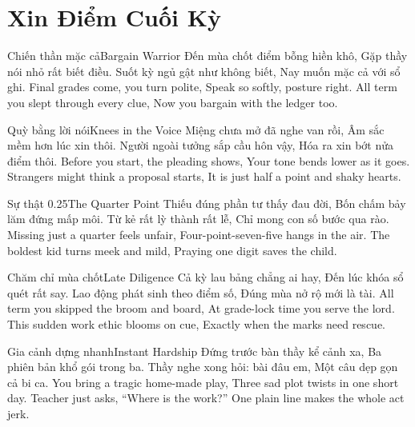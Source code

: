 \chapter{Xin Điểm Cuối Kỳ}

\begin{tutuyetbox}{Chiến thần mặc cả}{Bargain Warrior}
Đến mùa chốt điểm bỗng hiền khô,
Gặp thầy nói nhỏ rất biết điều.
Suốt kỳ ngủ gật như không biết,
Nay muốn mặc cả với sổ ghi.
\tcblower
Final grades come, you turn polite,
Speak so softly, posture right.
All term you slept through every clue,
Now you bargain with the ledger too.
\end{tutuyetbox}

\begin{tutuyetbox}{Quỳ bằng lời nói}{Knees in the Voice}
Miệng chưa mở đã nghe van rồi,
Âm sắc mềm hơn lúc xin thôi.
Người ngoài tưởng sắp cầu hôn vậy,
Hóa ra xin bớt nửa điểm thôi.
\tcblower
Before you start, the pleading shows,
Your tone bends lower as it goes.
Strangers might think a proposal starts,
It is just half a point and shaky hearts.
\end{tutuyetbox}

\begin{tutuyetbox}{Sự thật 0.25}{The Quarter Point}
Thiếu đúng phần tư thấy đau đời,
Bốn chấm bảy lăm đứng mấp môi.
Từ kẻ rất lỳ thành rất lễ,
Chỉ mong con số bước qua rào.
\tcblower
Missing just a quarter feels unfair,
Four-point-seven-five hangs in the air.
The boldest kid turns meek and mild,
Praying one digit saves the child.
\end{tutuyetbox}

\begin{tutuyetbox}{Chăm chỉ mùa chốt}{Late Diligence}
Cả kỳ lau bảng chẳng ai hay,
Đến lúc khóa sổ quét rất say.
Lao động phát sinh theo điểm số,
Đúng mùa nở rộ mới là tài.
\tcblower
All term you skipped the broom and board,
At grade-lock time you serve the lord.
This sudden work ethic blooms on cue,
Exactly when the marks need rescue.
\end{tutuyetbox}

\begin{tutuyetbox}{Gia cảnh dựng nhanh}{Instant Hardship}
Đứng trước bàn thầy kể cảnh xa,
Ba phiên bản khổ gói trong ba.
Thầy nghe xong hỏi: bài đâu em,
Một câu dẹp gọn cả bi ca.
\tcblower
You bring a tragic home-made play,
Three sad plot twists in one short day.
Teacher just asks, “Where is the work?”
One plain line makes the whole act jerk.
\end{tutuyetbox}

